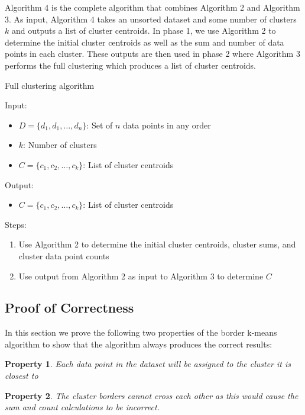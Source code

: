 \documentclass[conference,compsoc]{IEEEtran}
\newtheorem{prp}{Property}
\begin{document}
Algorithm 4 is the complete algorithm that combines Algorithm 2 and Algorithm 3. As input, Algorithm 4 takes an unsorted dataset and some number of clusters $k$ and outputs a list of cluster centroids. In phase 1, we use Algorithm 2 to determine the initial cluster centroids as well as the sum and number of data points in each cluster. These outputs are then used in phase 2 where Algorithm 3 performs the full clustering which produces a list of cluster centroids.


\begin{algorithm}\label{alg-4}
    \caption{Full clustering algorithm}
    Input:
        \begin{itemize}
            \item $D = \{d_1, d_1, \dots, d_n\}$: Set of $n$ data points in any order
            \item $k$: Number of clusters
            \item $C = \{c_1, c_2, \dots, c_k\}$: List of cluster centroids
        \end{itemize}
    Output:
        \begin{itemize}
            \item $C = \{c_1, c_2, \dots, c_k\}$: List of cluster centroids
        \end{itemize}
    Steps:
        \begin{enumerate}
            \item Use Algorithm 2 to determine the initial cluster centroids, cluster sums, and cluster data point counts
            \item Use output from Algorithm 2 as input to Algorithm 3 to determine $C$ 
        \end{enumerate}
\end{algorithm}


\subsection{Proof of Correctness}

In this section we prove the following two properties of the border k-means algorithm to show that the algorithm always produces the correct results:
\begin{prp}\label{closest-centroid}Each data point in the dataset will be assigned to the cluster it is closest to\end{prp}
\begin{prp}\label{border-cross}The cluster borders cannot cross each other as this would cause the sum and count calculations to be incorrect.\end{prp}
\end{document}
